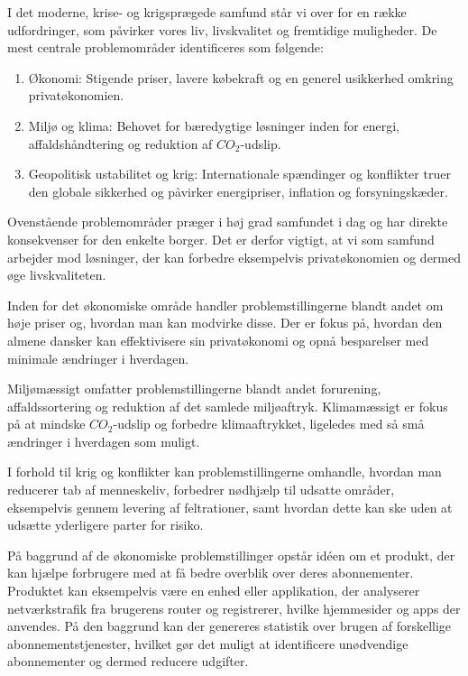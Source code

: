 

I det moderne, krise- og krigsprægede samfund står vi over for en række udfordringer, som påvirker vores liv, livskvalitet og fremtidige muligheder. De mest centrale problemområder identificeres som følgende:

\begin{enumerate}
    \item Økonomi: Stigende priser, lavere købekraft og en generel usikkerhed omkring privatøkonomien.
    \item Miljø og klima: Behovet for bæredygtige løsninger inden for energi, affaldshåndtering og reduktion af $CO_2$-udslip.
    \item Geopolitisk ustabilitet og krig: Internationale spændinger og konflikter truer den globale sikkerhed og påvirker energipriser, inflation og forsyningskæder.
\end{enumerate}

Ovenstående problemområder præger i høj grad samfundet i dag og har direkte konsekvenser for den enkelte borger. Det er derfor vigtigt, at vi som samfund arbejder mod løsninger, der kan forbedre eksempelvis privatøkonomien og dermed øge livskvaliteten.

Inden for det økonomiske område handler problemstillingerne blandt andet om høje priser og, hvordan man kan modvirke disse. Der er fokus på, hvordan den almene dansker kan effektivisere sin privatøkonomi og opnå besparelser med minimale ændringer i hverdagen.

Miljømæssigt omfatter problemstillingerne blandt andet forurening, affaldssortering og reduktion af det samlede miljøaftryk. Klimamæssigt er fokus på at mindske $CO_2$-udslip og forbedre klimaaftrykket, ligeledes med så små ændringer i hverdagen som muligt.

I forhold til krig og konflikter kan problemstillingerne omhandle, hvordan man reducerer tab af menneskeliv, forbedrer nødhjælp til udsatte områder, eksempelvis gennem levering af feltrationer, samt hvordan dette kan ske uden at udsætte yderligere parter for risiko.

På baggrund af de økonomiske problemstillinger opstår idéen om et produkt, der kan hjælpe forbrugere med at få bedre overblik over deres abonnementer. Produktet kan eksempelvis være en enhed eller applikation, der analyserer netværkstrafik fra brugerens router og registrerer, hvilke hjemmesider og apps der anvendes. På den baggrund kan der genereres statistik over brugen af forskellige abonnementstjenester, hvilket gør det muligt at identificere unødvendige abonnementer og dermed reducere udgifter.


